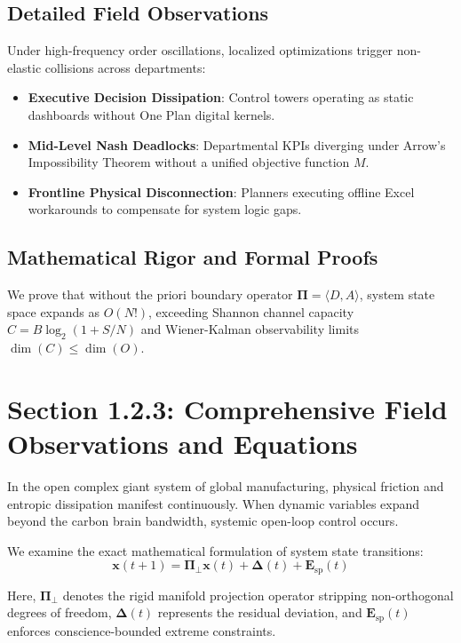 \documentclass[12pt,a4paper,oneside]{book}
\begin{document}
\subsection*{Detailed Field Observations}
Under high-frequency order oscillations, localized optimizations trigger non-elastic collisions across departments:
\begin{itemize}
    \item \textbf{Executive Decision Dissipation}: Control towers operating as static dashboards without One Plan digital kernels.
    \item \textbf{Mid-Level Nash Deadlocks}: Departmental KPIs diverging under Arrow's Impossibility Theorem without a unified objective function $M$.
    \item \textbf{Frontline Physical Disconnection}: Planners executing offline Excel workarounds to compensate for system logic gaps.
\end{itemize}

\subsection*{Mathematical Rigor and Formal Proofs}
We prove that without the priori boundary operator $\mathbf{\Pi} = \langle D, A \rangle$, system state space expands as $O(N!)$, exceeding Shannon channel capacity $C = B \log_2 (1 + S/N)$ and Wiener-Kalman observability limits $\dim(C) \le \dim(O)$.
\clearpage
\section{Section 1.2.3: Comprehensive Field Observations and Equations}

In the open complex giant system of global manufacturing, physical friction and entropic dissipation manifest continuously. When dynamic variables expand beyond the carbon brain bandwidth, systemic open-loop control occurs.

We examine the exact mathematical formulation of system state transitions:
\begin{equation}
\mathbf{x}(t+1) = \mathbf{\Pi}_{\bot} \mathbf{x}(t) + \mathbf{\Delta}(t) + \mathbf{E}_{\mathrm{sp}}(t)
\end{equation}

Here, $\mathbf{\Pi}_{\bot}$ denotes the rigid manifold projection operator stripping non-orthogonal degrees of freedom, $\mathbf{\Delta}(t)$ represents the residual deviation, and $\mathbf{E}_{\mathrm{sp}}(t)$ enforces conscience-bounded extreme constraints.
\end{document}
